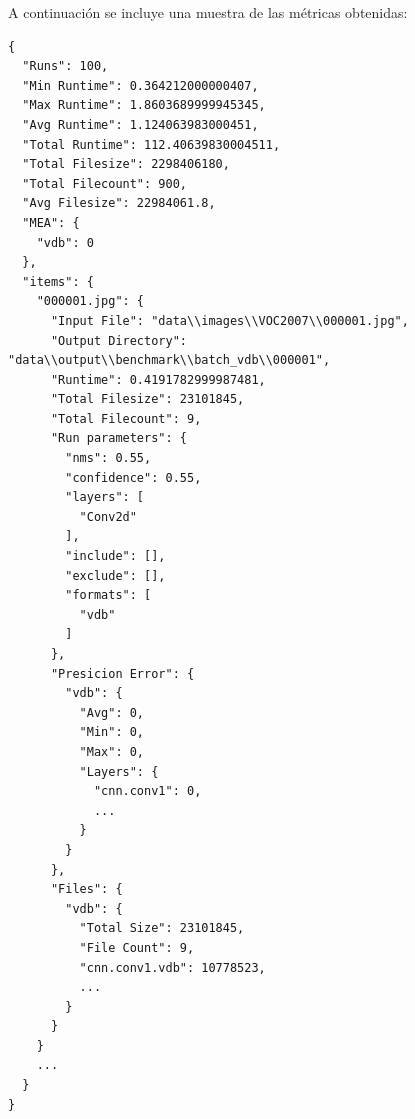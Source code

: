 A continuación se incluye una muestra de las métricas obtenidas:
\begin{verbatim}
{
  "Runs": 100,
  "Min Runtime": 0.364212000000407,
  "Max Runtime": 1.8603689999945345,
  "Avg Runtime": 1.124063983000451,
  "Total Runtime": 112.40639830004511,
  "Total Filesize": 2298406180,
  "Total Filecount": 900,
  "Avg Filesize": 22984061.8,
  "MEA": {
    "vdb": 0
  },
  "items": {
    "000001.jpg": {
      "Input File": "data\\images\\VOC2007\\000001.jpg",
      "Output Directory": "data\\output\\benchmark\\batch_vdb\\000001",
      "Runtime": 0.4191782999987481,
      "Total Filesize": 23101845,
      "Total Filecount": 9,
      "Run parameters": {
        "nms": 0.55,
        "confidence": 0.55,
        "layers": [
          "Conv2d"
        ],
        "include": [],
        "exclude": [],
        "formats": [
          "vdb"
        ]
      },
      "Presicion Error": {
        "vdb": {
          "Avg": 0,
          "Min": 0,
          "Max": 0,
          "Layers": {
            "cnn.conv1": 0,
            ...
          }
        }
      },
      "Files": {
        "vdb": {
          "Total Size": 23101845,
          "File Count": 9,
          "cnn.conv1.vdb": 10778523,
          ...
        }
      }
    }
    ...
  }
}
\end{verbatim}